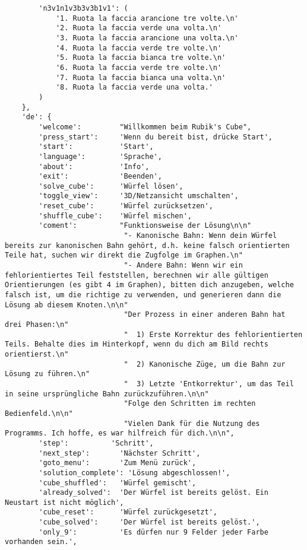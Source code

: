 \begin{lstlisting}
        'n3v1n1v3b3v3b1v1': (
            '1. Ruota la faccia arancione tre volte.\n'
            '2. Ruota la faccia verde una volta.\n'
            '3. Ruota la faccia arancione una volta.\n'
            '4. Ruota la faccia verde tre volte.\n'
            '5. Ruota la faccia bianca tre volte.\n'
            '6. Ruota la faccia verde tre volte.\n'
            '7. Ruota la faccia bianca una volta.\n'
            '8. Ruota la faccia verde una volta.'
        )
    },
    'de': {
        'welcome':         "Willkommen beim Rubik's Cube",
        'press_start':     'Wenn du bereit bist, drücke Start',
        'start':           'Start',
        'language':        'Sprache',
        'about':           'Info',
        'exit':            'Beenden',
        'solve_cube':      'Würfel lösen',
        'toggle_view':     '3D/Netzansicht umschalten',
        'reset_cube':      'Würfel zurücksetzen',
        'shuffle_cube':    'Würfel mischen',
        'coment':          "Funktionsweise der Lösung\n\n"
                            "- Kanonische Bahn: Wenn dein Würfel bereits zur kanonischen Bahn gehört, d.h. keine falsch orientierten Teile hat, suchen wir direkt die Zugfolge im Graphen.\n"
                            "- Andere Bahn: Wenn wir ein fehlorientiertes Teil feststellen, berechnen wir alle gültigen Orientierungen (es gibt 4 im Graphen), bitten dich anzugeben, welche falsch ist, um die richtige zu verwenden, und generieren dann die Lösung ab diesem Knoten.\n\n"
                            "Der Prozess in einer anderen Bahn hat drei Phasen:\n"
                            "  1) Erste Korrektur des fehlorientierten Teils. Behalte dies im Hinterkopf, wenn du dich am Bild rechts orientierst.\n"
                            "  2) Kanonische Züge, um die Bahn zur Lösung zu führen.\n"
                            "  3) Letzte 'Entkorrektur', um das Teil in seine ursprüngliche Bahn zurückzuführen.\n\n"
                            "Folge den Schritten im rechten Bedienfeld.\n\n"
                            "Vielen Dank für die Nutzung des Programms. Ich hoffe, es war hilfreich für dich.\n\n",
        'step':          'Schritt',
        'next_step':       'Nächster Schritt',
        'goto_menu':       'Zum Menü zurück',
        'solution_complete': 'Lösung abgeschlossen!',
        'cube_shuffled':   'Würfel gemischt',
        'already_solved':  'Der Würfel ist bereits gelöst. Ein Neustart ist nicht möglich',
        'cube_reset':      'Würfel zurückgesetzt',
        'cube_solved':     'Der Würfel ist bereits gelöst.',
        'only_9':          'Es dürfen nur 9 Felder jeder Farbe vorhanden sein.',

\end{lstlisting}
